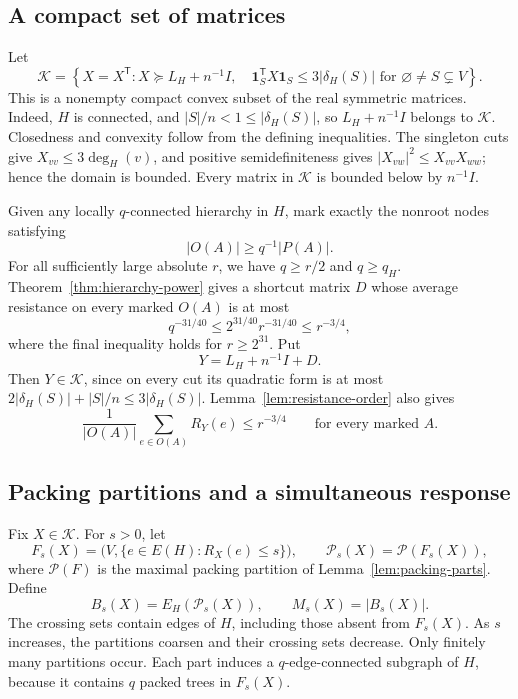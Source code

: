\documentclass[11pt]{amsart}
\theoremstyle{definition}
\theoremstyle{remark}
\numberwithin{equation}{section}
\begin{document}
\subsection{A compact set of matrices}

Let
\begin{equation}\label{eq:compact-domain}
 \mathcal K=
 \left\{X=X^{\mathsf T}:
 X\succeq L_H+n^{-1}I,\quad
 \mathbf1_S^{\mathsf T}X\mathbf1_S\le3|\delta_H(S)|
 \text{ for }\varnothing\ne S\subsetneq V\right\}.
\end{equation}
This is a nonempty compact convex subset of the real symmetric
matrices. Indeed, \(H\) is connected, and
\(|S|/n<1\le|\delta_H(S)|\), so \(L_H+n^{-1}I\) belongs to
\(\mathcal K\). Closedness and convexity follow from the defining
inequalities. The singleton cuts give
\(X_{vv}\le3\deg_H(v)\), and positive semidefiniteness gives
\(|X_{vw}|^2\le X_{vv}X_{ww}\); hence the domain is bounded.
Every matrix in \(\mathcal K\) is bounded below by \(n^{-1}I\).

Given any locally \(q\)-connected hierarchy in \(H\), mark exactly
the nonroot nodes satisfying
\[
 |O(A)|\ge q^{-1}|P(A)|.
\]
For all sufficiently large absolute \(r\), we have \(q\ge r/2\)
and \(q\ge q_H\). Theorem~\ref{thm:hierarchy-power} gives a shortcut
matrix \(D\) whose average resistance on every marked \(O(A)\) is
at most
\[
 q^{-31/40}\le2^{31/40}r^{-31/40}\le r^{-3/4},
\]
where the final inequality holds for \(r\ge2^{31}\). Put
\begin{equation}\label{eq:hierarchy-response}
 Y=L_H+n^{-1}I+D.
\end{equation}
Then \(Y\in\mathcal K\), since on every cut its quadratic form is
at most \(2|\delta_H(S)|+|S|/n\le3|\delta_H(S)|\).
Lemma~\ref{lem:resistance-order} also gives
\begin{equation}\label{eq:response-average}
 \frac1{|O(A)|}\sum_{e\in O(A)}R_Y(e)\le r^{-3/4}
 \qquad\text{for every marked }A.
\end{equation}

\subsection{Packing partitions and a simultaneous response}

Fix \(X\in\mathcal K\). For \(s>0\), let
\[
 F_s(X)=\bigl(V,\{e\in E(H):R_X(e)\le s\}\bigr),
 \qquad
 \mathcal P_s(X)=\mathcal P(F_s(X)),
\]
where \(\mathcal P(F)\) is the maximal packing partition of
Lemma~\ref{lem:packing-parts}. Define
\[
 B_s(X)=E_H(\mathcal P_s(X)),\qquad M_s(X)=|B_s(X)|.
\]
The crossing sets contain edges of \(H\), including those absent
from \(F_s(X)\).
As \(s\) increases, the partitions coarsen and their crossing sets
decrease. Only finitely many partitions occur.
Each part induces a \(q\)-edge-connected subgraph of \(H\),
because it contains \(q\) packed trees in \(F_s(X)\).
\end{document}
